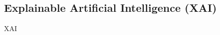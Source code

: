 











\subsection{Explainable Artificial Intelligence (XAI)} \label{ssec:xai}

\ac{XAI}

\cite{Arieta2020}

